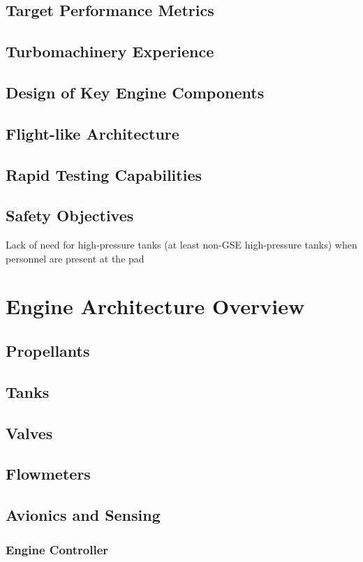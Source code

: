 \documentclass[12pt, letterpaper]{article}
\begin{document}
\newpage

\subsection{Target Performance Metrics}
\subsection{Turbomachinery Experience}
\subsection{Design of Key Engine Components}
\subsection{Flight-like Architecture}
\subsection{Rapid Testing Capabilities}
\subsection{Safety Objectives}
Lack of need for high-pressure tanks (at least non-GSE high-pressure tanks) when personnel are present at the pad

\section{Engine Architecture Overview}
\subsection{Propellants}
\subsection{Tanks}
\subsection{Valves}
\subsection{Flowmeters}
\subsection{Avionics and Sensing}
\subsubsection{Engine Controller}
\end{document}
